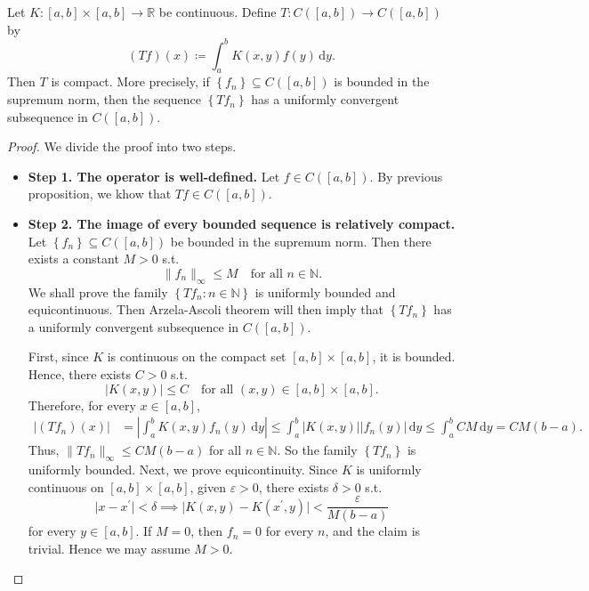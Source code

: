 \begin{theorem}
    Let \(K : [a, b] \times [a, b] \to \mathbb{R} \) be continuous. Define \(T: C([a, b]) \to C([a, b])\) by 
    \[
        (Tf)(x) \coloneqq \int _a^b K(x, y) f(y) \, \mathrm{d} y. 
    \]  
    Then \(T\) is compact. More precisely, if \(\left\{ f_n \right\} \subseteq C([a, b]) \) is bounded in the supremum norm, then the sequence \(\left\{ T f_n \right\} \) has a uniformly convergent subsequence in \(C([a, b])\).    
\end{theorem}

\begin{proof}
    We divide the proof into two steps. 
    \begin{itemize}
        \item \textbf{Step 1. The operator is well-defined.} Let \(f \in C([a, b])\). By previous proposition, we khow that \(Tf \in C([a, b])\). 
        \item \textbf{Step 2. The image of every bounded sequence is relatively compact.} Let \(\left\{ f_n \right\} \subseteq C([a, b]) \) be bounded in the supremum norm. Then there exists a constant \(M > 0\) s.t. 
        \[
            \lVert f_n \rVert_\infty  \le M \quad \text{for all } n \in \mathbb{N}.  
        \]
        We shall prove the family \(\left\{ T f_n: n \in \mathbb{N} \right\} \) is uniformly bounded and equicontinuous. Then Arzela-Ascoli theorem will then imply that \(\left\{ T f_n \right\} \) has a uniformly convergent subsequence in \(C([a, b])\). 

        First, since \(K\) is continuous on the compact set \([a, b] \times [a, b]\), it is bounded. Hence, there exists \(C > 0\) s.t. 
        \[
            \vert K(x, y) \vert \le C \quad \text{for all } (x, y) \in [a, b] \times [a, b].  
        \]     
        Therefore, for every \(x \in [a, b]\), 
        \begin{align*}
            \vert (Tf_n)(x) \vert &= \left\vert \int _a^b K(x, y) f_n(y) \, \mathrm{d} y  \right\vert \le \int _a^b \vert K(x, y) \vert \vert f_n(y) \vert \, \mathrm{d} y \le \int _a^b CM \, \mathrm{d} y = CM(b - a).      
        \end{align*} 
        Thus, \(\lVert Tf_n \rVert_\infty \le CM(b - a) \) for all \(n \in \mathbb{N}\). So the family \(\left\{ Tf_n \right\} \) is uniformly bounded. Next, we prove equicontinuity. Since \(K\) is uniformly continuous on \([a, b] \times [a, b]\), given \(\varepsilon > 0\), there exists \(\delta > 0\) s.t. 
        \[
            \vert x - x^{\prime}  \vert < \delta \implies \vert K(x, y) - K(x^{\prime} , y) \vert < \frac{\varepsilon}{M(b - a)} 
        \]       
        for every \(y \in [a, b]\). If \(M = 0\), then \(f_n = 0\) for every \(n\), and the claim is trivial. Hence we may assume \(M > 0\). 


\end{itemize}
\end{proof}
